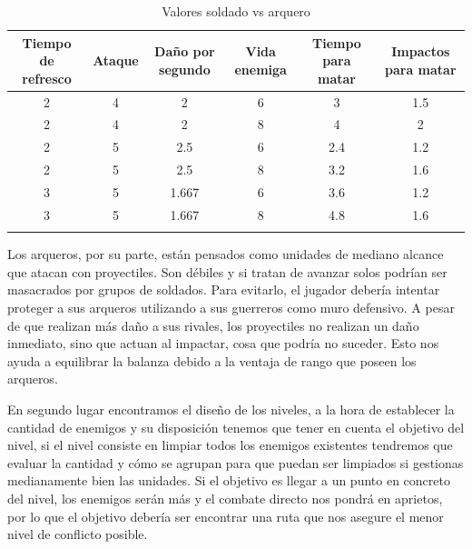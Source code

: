 \begin{longtable}[c]{|c|c|c|c|c|c|}
\hline
\multicolumn{1}{|m{1.8cm}|}{Tiempo de refresco} & \multicolumn{1}{m{1.2cm}|}{Ataque}             &
\multicolumn{1}{m{1.7cm}|}{Daño por segundo}   & \multicolumn{1}{m{1.4cm}|}{Vida enemiga}        &
\multicolumn{1}{m{1.2cm}|}{Tiempo para matar}  & \multicolumn{1}{m{1.45cm}|}{Impactos para matar}\\
\hline
\hline
\endhead
\multicolumn{1}{|S|}{2} & \multicolumn{1}{S|}{4} & \multicolumn{1}{S|}{2} & 
\multicolumn{1}{S|}{6}  & \multicolumn{1}{S|}{3} & \multicolumn{1}{S|}{1.5} \\
\hline
\multicolumn{1}{|S|}{2} & \multicolumn{1}{S|}{4} & \multicolumn{1}{S|}{2}   & 
\multicolumn{1}{S|}{8}  & \multicolumn{1}{S|}{4} & \multicolumn{1}{S|}{2} \\ 
\hline
\multicolumn{1}{|S|}{2} & \multicolumn{1}{S|}{5}   & \multicolumn{1}{S|}{2.5} & 
\multicolumn{1}{S|}{6}  & \multicolumn{1}{S|}{2.4} & \multicolumn{1}{S|}{1.2} \\ 
\hline
\multicolumn{1}{|S|}{2} & \multicolumn{1}{S|}{5}   & \multicolumn{1}{S|}{2.5} & 
\multicolumn{1}{S|}{8}  & \multicolumn{1}{S|}{3.2} & \multicolumn{1}{S|}{1.6} \\
\hline
\multicolumn{1}{|S|}{3} & \multicolumn{1}{S|}{5}   & \multicolumn{1}{S|}{1.667} & 
\multicolumn{1}{S|}{6}  & \multicolumn{1}{S|}{3.6} & \multicolumn{1}{S|}{1.2}   \\
\hline
\multicolumn{1}{|S|}{3} & \multicolumn{1}{S|}{5}   & \multicolumn{1}{S|}{1.667} & 
\multicolumn{1}{S|}{8}  & \multicolumn{1}{S|}{4.8} & \multicolumn{1}{S|}{1.6}   \\
\hline
\caption{Valores soldado vs arquero}
\end{longtable}

Los arqueros, por su parte, están pensados como unidades de mediano alcance que atacan con proyectiles.
Son débiles y si tratan de avanzar solos podrían ser masacrados por grupos de soldados. Para evitarlo,
el jugador debería intentar proteger a sus arqueros utilizando a sus guerreros como muro defensivo. 
A pesar de que realizan más daño a sus rivales, los proyectiles no realizan un daño inmediato, sino que
actuan al impactar, cosa que podría no suceder. Esto nos ayuda a equilibrar la balanza debido a la ventaja
de rango que poseen los arqueros.

En segundo lugar encontramos el diseño de los niveles, a la hora de establecer la cantidad de enemigos
y su disposición tenemos que tener en cuenta el objetivo del nivel, si el nivel consiste en limpiar
todos los enemigos existentes tendremos que evaluar la cantidad y cómo se agrupan para que puedan
ser limpiados si gestionas medianamente bien las unidades. Si el objetivo es llegar a un punto en concreto
del nivel, los enemigos serán más y el combate directo nos pondrá en aprietos, por lo que el objetivo
debería ser encontrar una ruta que nos asegure el menor nivel de conflicto posible.

